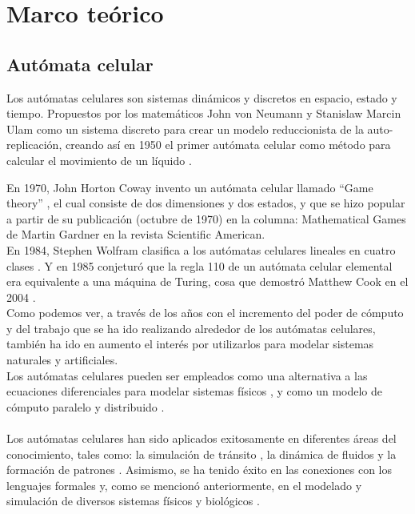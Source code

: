 \chapter{Marco teórico}

\section{Autómata celular}
Los autómatas celulares son sistemas dinámicos y discretos en espacio, estado y tiempo. Propuestos por los matemáticos John von Neumann y Stanislaw Marcin Ulam como un sistema discreto para crear un modelo reduccionista de la auto-replicación, creando así en 1950 el primer autómata celular como método para calcular el movimiento de un líquido \citep{biaynicki2012}. 

En 1970, John Horton Coway invento un autómata celular llamado “Game theory” \citep{gardner1970mathematical}, el cual consiste de dos dimensiones y dos estados, y que se hizo popular a partir de su publicación
(octubre de 1970) en la columna: Mathematical Games de Martin Gardner en la revista Scientific American.
\\
En 1984, Stephen Wolfram clasifica a los autómatas celulares lineales en cuatro clases \citep{WOLFRAM19841}. Y en 1985 conjeturó que la regla 110 de un autómata celular elemental era equivalente a una máquina de Turing, cosa que demostró Matthew Cook en el 2004 \citep{cook2004universality}.
\\
Como podemos ver, a través de los años con el incremento del poder de cómputo y del trabajo que se ha ido realizando alrededor de los autómatas celulares, también ha ido en aumento el interés por utilizarlos para modelar sistemas naturales y artificiales.
\\
Los autómatas celulares pueden ser empleados como una alternativa a las ecuaciones diferenciales para modelar sistemas físicos \citep{toffoli1984cellular}, y como un modelo de cómputo paralelo y distribuido \citep{hillis1984connection}.
\\
\\
Los autómatas celulares han sido aplicados exitosamente en diferentes áreas del conocimiento, tales como: la simulación de tránsito \citep{nagel1992cellular,simon1998simplified}, la dinámica de fluidos  \citep{margolus1986cellular} y la formación de patrones \citep{tamayo1987cellular,boerlijstk}. Asimismo, se ha tenido éxito en las conexiones con los lenguajes formales \citep{nordahl1989formal,culik1990computation} y, como se mencionó anteriormente, en el modelado y simulación de diversos sistemas físicos \citep{vichniac1984simulating,manneville2012cellular} y biológicos \citep{ermentrout1993cellular}.

